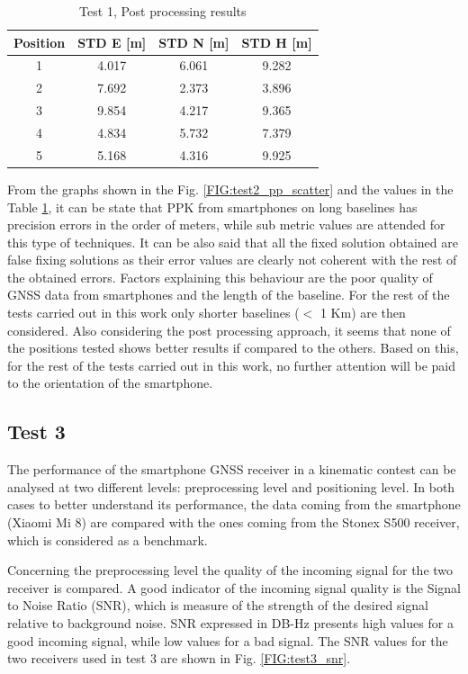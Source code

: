 \begin{table}[H]
	\centering
	\begin{tabular}{|c|c|c|c|}
	\hline
	\textbf{Position} &\textbf{STD E [m]}&\textbf{STD N [m]}&\textbf{STD H [m]}\\
    \hline
	 1 & 4.017 & 6.061  & 9.282\\  
    \hline
     2 & 7.692 & 2.373  & 3.896\\  
    \hline
     3 & 9.854 & 4.217  & 9.365\\  
    \hline
     4 & 4.834 & 5.732   & 7.379 \\  
    \hline
     5 & 5.168 &  4.316& 9.925\\  
    \hline
	\end{tabular} 
	\caption{Test 1, Post processing results}
	\label{tab:test2_pp_fixflt}
\end{table}

From the graphs shown in the Fig. \ref{FIG:test2_pp_scatter} and the values in the Table \ref{tab:test2_pp_fixflt}, it can be state that PPK from smartphones on long baselines has precision errors in the order of meters, while sub metric values are attended for this type of techniques. It can be also said that all the fixed solution obtained are false fixing solutions as their error values are clearly not coherent with the rest of the obtained errors. 
Factors explaining this behaviour are the poor quality of GNSS data from smartphones and the length of the baseline. For the rest of the tests carried out in this work only shorter baselines ($<$ 1 Km) are then considered.
Also considering the post processing approach, it seems that none of the positions tested shows better results if compared to the others. Based on this, for the rest of the tests carried out in this work, no further attention will be paid to the orientation of the smartphone.


\subsection{Test 3}


The performance of the smartphone GNSS receiver in a kinematic contest can be analysed at two different levels: preprocessing level and positioning level. In both cases to better understand its performance, the data coming from the smartphone (Xiaomi Mi 8) are compared with the ones coming from the Stonex S500 receiver, which is considered as a benchmark.

Concerning the preprocessing level the quality of the incoming signal for the two receiver is compared. A good indicator of the incoming signal quality is the Signal to Noise Ratio (SNR), which is measure of the strength of the desired signal relative to background noise. SNR expressed in DB-Hz presents high values for a good incoming signal, while low values for a bad signal. The SNR values for the two receivers used in test 3 are shown in Fig. \ref{FIG:test3_snr}.

